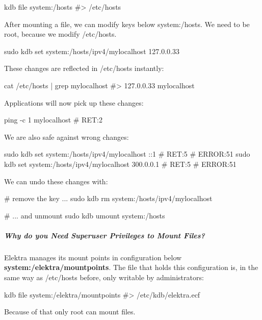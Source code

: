\begin{DoxyCode}
kdb file system:/hosts
#> /etc/hosts
\end{DoxyCode}


After mounting a file, we can modify keys below {\ttfamily system\+:/hosts}. We need to be root, because we modify {\ttfamily /etc/hosts}.


\begin{DoxyCode}
sudo kdb set system:/hosts/ipv4/mylocalhost 127.0.0.33
\end{DoxyCode}


These changes are reflected in {\ttfamily /etc/hosts} instantly\+:


\begin{DoxyCode}
cat /etc/hosts | grep mylocalhost
#> 127.0.0.33   mylocalhost
\end{DoxyCode}


Applications will now pick up these changes\+:


\begin{DoxyCode}
ping -c 1 mylocalhost
# RET:2
\end{DoxyCode}


We are also safe against wrong changes\+:


\begin{DoxyCode}
sudo kdb set system:/hosts/ipv4/mylocalhost ::1
# RET:5
# ERROR:51
sudo kdb set system:/hosts/ipv4/mylocalhost 300.0.0.1
# RET:5
# ERROR:51
\end{DoxyCode}


We can undo these changes with\+:


\begin{DoxyCode}
# remove the key ...
sudo kdb rm system:/hosts/ipv4/mylocalhost

# ... and unmount
sudo kdb umount system:/hosts
\end{DoxyCode}


\subparagraph*{Why do you Need Superuser Privileges to Mount Files?}

Elektra manages its mount points in configuration below {\bfseries system\+:/elektra/mountpoints}. The file that holds this configuration is, in the same way as {\ttfamily /etc/hosts} before, only writable by administrators\+:


\begin{DoxyCode}
kdb file system:/elektra/mountpoints
#> /etc/kdb/elektra.ecf
\end{DoxyCode}


Because of that only root can mount files.

